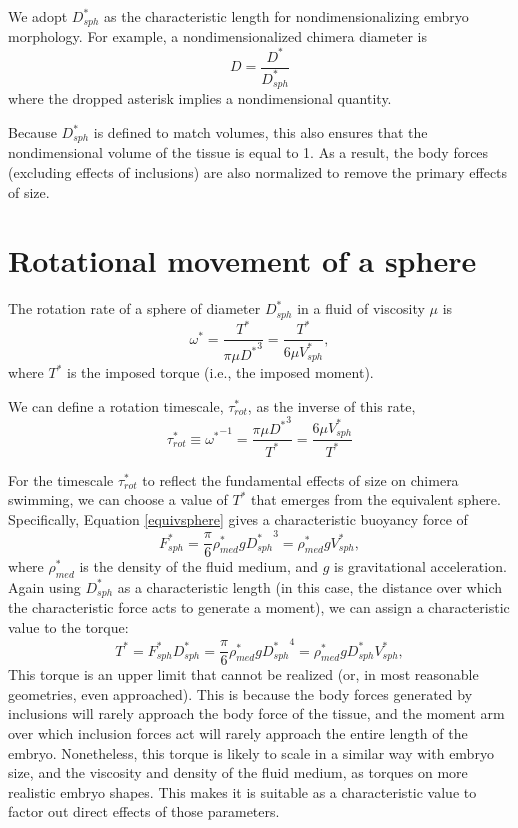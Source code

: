 \documentclass[10pt,a4paper]{article}
\begin{document}
We adopt $D_{sph}^*$ as the characteristic length for nondimensionalizing embryo morphology.
For example, a nondimensionalized chimera diameter is
\begin{equation}\label{ndD}
	D = \frac{D^*}{D_{sph}^*}
\end{equation} 
where the dropped asterisk implies a nondimensional quantity.

Because $D_{sph}^*$ is defined to match volumes, this also ensures that the nondimensional volume of the tissue is equal to 1.
As a result, the body forces (excluding effects of inclusions) are also normalized to remove the primary effects of size.


\section{Rotational movement of a sphere}
The rotation rate of a sphere of diameter $D_{sph}^*$ in a fluid of viscosity $\mu$ is 
\begin{equation}\label{rot1}
	\omega^* = \frac{T^*}{\pi \mu {D^*}^3} = \frac{T^*}{6 \mu V_{sph}^*},	
\end{equation}
where $T^*$ is the imposed torque (i.e., the imposed moment).

We can define a rotation timescale, $\tau_{rot}^*$, as the inverse of this rate,
\begin{equation}\label{tau1}
	\tau_{rot}^* \equiv {\omega^*}^{-1} = \frac{\pi \mu {D^*}^3}{T^*} = \frac{6 \mu V_{sph}^*}{T^*}
\end{equation}

For the timescale $\tau_{rot}^*$ to reflect the fundamental effects of size on chimera swimming, we can choose a value of $T^*$ that emerges from the equivalent sphere.
Specifically, Equation \ref{equivsphere} gives a characteristic buoyancy force of
\begin{equation}\label{charF}
	F_{sph}^* = \frac{\pi}{6} \rho_{med}^* g {D_{sph}^*}^3 = \rho_{med}^* g V_{sph}^*,
\end{equation} 
where $\rho_{med}^*$ is the density of the fluid medium, and $g$ is gravitational acceleration.
Again using $D_{sph}^*$ as a characteristic length (in this case, the distance over which the characteristic force acts to generate a moment), we can assign a characteristic value to the torque:
\begin{equation}\label{charT}
	T^* = F_{sph}^* D_{sph}^* = \frac{\pi}{6} \rho_{med}^* g {D_{sph}^*}^4 = \rho_{med}^* g D_{sph}^* V_{sph}^*,
\end{equation} 
This torque is an upper limit that cannot be realized (or, in most reasonable geometries, even approached).
This is because the body forces generated by inclusions will rarely approach the body force of the tissue, and the moment arm over which inclusion forces act will rarely approach the entire length of the embryo. 
Nonetheless, this torque is likely to scale in a similar way with embryo size, and the viscosity and density of the fluid medium, as torques on more realistic embryo shapes. This makes it is suitable as a characteristic value to factor out direct effects of those parameters.
\end{document}
